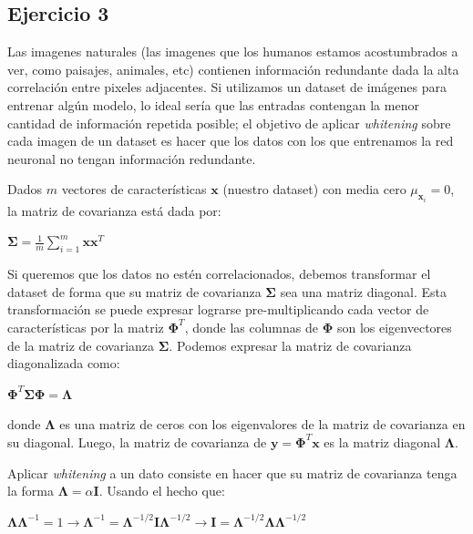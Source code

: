 \documentclass[11pt,spanish]{article}
\begin{document}
\subsection*{Ejercicio 3}
Las imagenes naturales (las imagenes que los humanos estamos acostumbrados a ver, como paisajes, animales, etc) contienen información redundante dada la alta correlación entre pixeles adjacentes. Si utilizamos un dataset de imágenes para entrenar algún modelo, lo ideal sería que las entradas contengan la menor cantidad de información repetida posible; el objetivo de aplicar \textit{whitening} sobre cada imagen de un dataset es hacer que los datos con los que entrenamos la red neuronal no tengan información redundante. \par
Dados $m$ vectores de características $\mathbf{x}$ (nuestro dataset) con media cero $\mu_{\mathbf{x}_i}=0$, la matriz de covarianza está dada por:
\begin{center}
	\begin{math}
		\mathbf{\Sigma} = \frac{1}{m} \sum_{i=1}^{m} \mathbf{x} \mathbf{x}^T
	\end{math}
\end{center}

Si queremos que los datos no estén correlacionados, debemos transformar el dataset de forma que su matriz de covarianza $\mathbf{\Sigma}$ sea una matriz diagonal. Esta transformación se puede expresar lograrse pre-multiplicando cada vector de características por la matriz $\mathbf{\Phi}^T$, donde las columnas de $\mathbf{\Phi}$ son los eigenvectores de la matriz de covarianza $\mathbf{\Sigma}$. Podemos expresar la matriz de covarianza diagonalizada como:

\begin{center}
	\begin{math}
		\mathbf{\Phi}^T \mathbf{\Sigma} \mathbf{\Phi} = \mathbf{\Lambda}
	\end{math}
\end{center}
donde $\mathbf{\Lambda}$ es una matriz de ceros con los eigenvalores de la matriz de covarianza en su diagonal. Luego, la matriz de covarianza de $\mathbf{y} = \mathbf{\Phi}^T \mathbf{x}$ es la matriz diagonal $\mathbf{\Lambda}$. \par
Aplicar \textit{whitening} a un dato consiste en hacer que su matriz de covarianza tenga la forma $\mathbf{\Lambda} = \alpha \mathbf{I}$. Usando el hecho que:

\begin{center}
	\begin{math}
		\mathbf{\Lambda}\mathbf{\Lambda}^{-1} = 1 \rightarrow \mathbf{\Lambda}^{-1} = \mathbf{\Lambda}^{-1/2} \mathbf{I} \mathbf{\Lambda}^{-1/2} \rightarrow  \mathbf{I} = \mathbf{\Lambda}^{-1/2} \mathbf{\Lambda} \mathbf{\Lambda}^{-1/2}
	\end{math}
\end{center}
\end{document}

